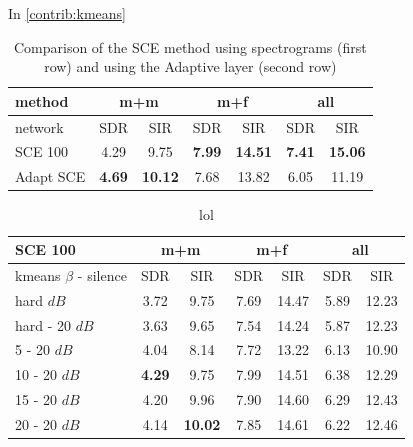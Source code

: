 \documentclass[master, tikz, final,11pt, dvipdfmx]{iscs-thesis}
\begin{document}
In \autoref{contrib:kmeans}

\lipsum[1]

\begin{table}[h]
\centering
\begin{tabular}{l|c|c|c|c|c|c}
method & \multicolumn{2}{c|}{m+m} & \multicolumn{2}{c|}{m+f} & \multicolumn{2}{c}{all} \\ 
\hline 
network & SDR & SIR & SDR & SIR & SDR & SIR \\ 
\hline 
SCE 100 & 4.29 & 9.75 & \textbf{7.99} & \textbf{14.51} & \textbf{7.41} & \textbf{15.06} \\ 
Adapt SCE & \textbf{4.69} & \textbf{10.12} & 7.68 & 13.82 & 6.05 & 11.19 \\ 
\end{tabular}
\captionsetup{justification=centering}
\caption{Comparison of the SCE method using spectrograms (first row) and using the Adaptive layer (second row)}
\label{table:SCE100softrecap}
\end{table}

\begin{table}[h]
\centering
\begin{tabular}{l|c|c|c|c|c|c}
SCE 100 & \multicolumn{2}{c|}{m+m} & \multicolumn{2}{c|}{m+f} & \multicolumn{2}{c}{all} \\ 
\hline 
kmeans $\beta$ - silence & SDR & SIR & SDR & SIR & SDR & SIR \\ 
\hline 
hard $dB$ & 3.72 & 9.75 & 7.69 & 14.47 & 5.89 & 12.23 \\ 
hard - 20 $dB$ & 3.63 & 9.65 & 7.54 & 14.24 & 5.87 & 12.23 \\ 
\hline 
\hline 
5 - 20 $dB$ & 4.04 & 8.14 & 7.72 & 13.22 & 6.13 & 10.90 \\ 
10 - 20 $dB$ & \cellcolor{green}\textbf{4.29} & \cellcolor{green}9.75 & \cellcolor{green}7.99 & \cellcolor{green}14.51 & 6.38 & 12.29 \\ 
15 - 20 $dB$ & 4.20 & 9.96 & 7.90 & 14.60 & 6.29 & 12.43 \\ 
20 - 20 $dB$ & 4.14 & \textbf{10.02} & 7.85 & 14.61 & 6.22 & 12.46 \\ 
\end{tabular}
\captionsetup{justification=centering}
\caption{lol}
\label{table:SCE100softkmeans}
\end{table}
\end{document}
